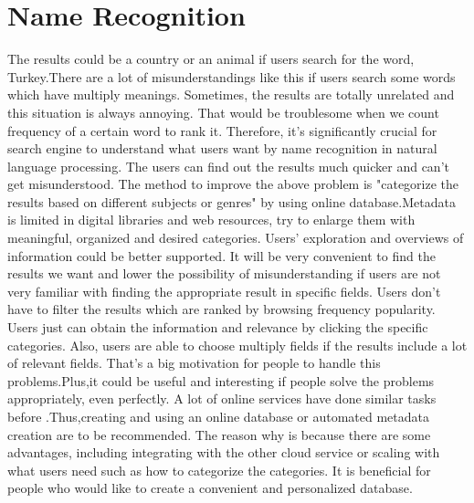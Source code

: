 \section*{Name Recognition}
The results could be a country or an animal if users search for the word, Turkey.There are a lot of misunderstandings like this if users search some words which have multiply meanings. Sometimes, the results are totally unrelated and this situation is always annoying. That would be troublesome when we count frequency of a certain word to rank it. 
Therefore, it's significantly crucial for search engine to understand what users want by name recognition in natural language processing. The users can find out the results much quicker and can't get misunderstood.
The method to improve the above problem is "categorize the results based on different subjects or genres" by using online database.Metadata is limited in digital libraries and web resources, try to enlarge them with meaningful, organized and desired categories.\cite{10.1145/1141753.1141801}
Users' exploration and overviews of information could be better supported. It will be very convenient to find the results we want and lower the possibility of misunderstanding if users are not very familiar with finding the appropriate result in specific fields.\cite{DBLP:journals/jis/NaT09} Users don't have to filter the results which are ranked by browsing frequency  popularity. Users just can obtain the information and relevance by clicking the specific categories. Also, users are able to choose multiply fields if the results include a lot of relevant fields. That's a big motivation for people to handle this problems.Plus,it could be useful and interesting if people solve the problems appropriately, even perfectly.  
A lot of online services have done similar tasks before .Thus,creating and using an online database or automated metadata creation are to be recommended. The reason why is because there are some advantages, including integrating with the other cloud service or scaling with what users need such as how to categorize the categories. It is beneficial for people who would like to create a convenient and personalized database.    \\

